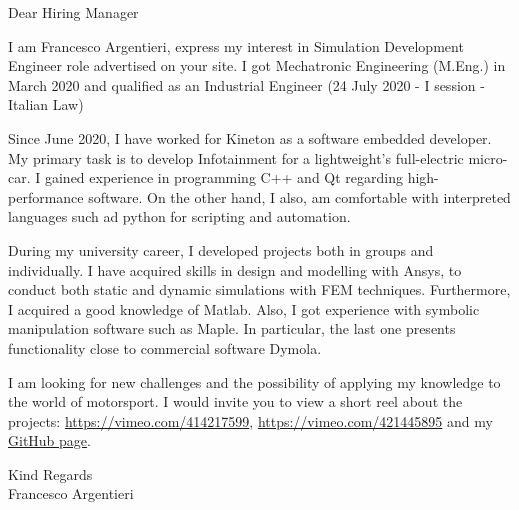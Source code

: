 \documentclass[a4paper,english]{friggeri-letter}
\begin{document}
\address{
   Circonvallazione Istoniense, 20 \\
   Vasto (CH), 66054 \\
   Italy
}



\opening{Dear Hiring Manager}
I am Francesco Argentieri, express my interest in Simulation Development Engineer role advertised on your site. I got Mechatronic Engineering (M.Eng.) in March 2020 and qualified as an Industrial Engineer (24 July 2020 - I session - Italian Law)

Since June 2020, I have worked for Kineton as a software embedded developer.
My primary task is to develop Infotainment for a lightweight’s full-electric micro-car.
I gained experience in programming C++ and Qt regarding high-performance software. On the other hand, I also, am comfortable with interpreted languages such ad python for scripting and automation.

During my university career, I developed projects both in groups and individually.
I have acquired skills in design and modelling with Ansys, to conduct both static and dynamic simulations with FEM techniques. Furthermore,
I acquired a good knowledge of Matlab. Also, I got experience with symbolic manipulation software such as Maple.
In particular, the last one presents functionality close to commercial software Dymola.

I am looking for new challenges and the possibility of applying my knowledge to the world of motorsport.
I would invite you to view a short reel about the projects: \href{https://vimeo.com/414217599}{https://vimeo.com/414217599}, \href{https://vimeo.com/421445895}{https://vimeo.com/421445895} and my \href{https://github.com/frank1789}{GitHub page}.


\closing{
   Kind Regards\\
   Francesco Argentieri
}
\end{document}
